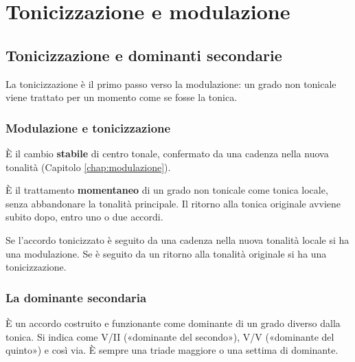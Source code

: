 \part{Tonicizzazione e modulazione}

\chapter{Tonicizzazione e dominanti secondarie}
\label{chap:tonicizzazione}

La tonicizzazione è il primo passo verso la modulazione: un grado non tonicale viene trattato per un momento come se fosse la tonica.

\section{Modulazione e tonicizzazione}
\label{sec:mod_vs_ton}

\begin{definizione}[Modulazione]
    È il cambio \textbf{stabile} di centro tonale, confermato da una cadenza nella nuova tonalità (Capitolo \ref{chap:modulazione}).
\end{definizione}

\begin{definizione}[Tonicizzazione]
    È il trattamento \textbf{momentaneo} di un grado non tonicale come tonica locale, senza abbandonare la tonalità principale. Il ritorno alla tonica originale avviene subito dopo, entro uno o due accordi.
\end{definizione}

\begin{regola}
    Se l'accordo tonicizzato è seguito da una cadenza nella nuova tonalità locale si ha una modulazione. Se è seguito da un ritorno alla tonalità originale si ha una tonicizzazione.
\end{regola}

\section{La dominante secondaria}
\label{sec:meccanismo_dominante}

\begin{definizione}
    È un accordo costruito e funzionante come dominante di un grado diverso dalla tonica. Si indica come V/II («dominante del secondo»), V/V («dominante del quinto») e così via. È sempre una triade maggiore o una settima di dominante.
\end{definizione}


